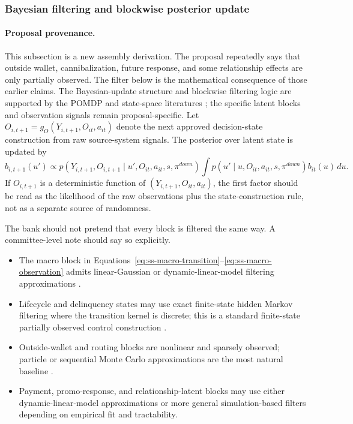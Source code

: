 \documentclass[11pt]{article}
\newcommand{\1}{\mathbf{1}}
\begin{document}
\subsubsection{Bayesian filtering and blockwise posterior update}
\label{subsec:state-space-filtering}

\paragraph{Proposal provenance.}
This subsection is a new assembly derivation. The proposal repeatedly says that
outside wallet, cannibalization, future response, and some relationship effects
are only partially observed. The filter below is the mathematical consequence of
those earlier claims. The Bayesian-update structure and blockwise filtering logic
are supported by the POMDP and state-space literatures
\citep{smallwood1973pomdp,kaelbling1998pomdp,durbinkoopman2012ssm,
westharrison1997bfdm,doucet2001smc}; the specific latent blocks and observation
signals remain proposal-specific. Let $O_{i,t+1}=g_O(Y_{i,t+1},O_{it},a_{it})$
denote the next approved decision-state construction from raw source-system
signals. The posterior over latent state is updated by
\begin{equation}
  b_{i,t+1}(u')
  \propto
  p(Y_{i,t+1},O_{i,t+1}\mid u',O_{it},a_{it},s,\pi^{down})
  \int p(u'\mid u,O_{it},a_{it},s,\pi^{down})b_{it}(u)\,du.
  \label{eq:ss-filter-update}
\end{equation}
If $O_{i,t+1}$ is a deterministic function of $(Y_{i,t+1},O_{it},a_{it})$, the
first factor should be read as the likelihood of the raw observations plus the
state-construction rule, not as a separate source of randomness.

The bank should not pretend that every block is filtered the same way. A
committee-level note should say so explicitly.
\begin{itemize}[leftmargin=*]
  \item The macro block in Equations~\eqref{eq:ss-macro-transition}--\eqref{eq:ss-macro-observation}
        admits linear-Gaussian or dynamic-linear-model filtering approximations
        \citep{durbinkoopman2012ssm,westharrison1997bfdm}.
  \item Lifecycle and delinquency states may use exact finite-state hidden
        Markov filtering where the transition kernel is discrete; this is a
        standard finite-state partially observed control construction
        \citep{smallwood1973pomdp,kaelbling1998pomdp}.
  \item Outside-wallet and routing blocks are nonlinear and sparsely observed;
        particle or sequential Monte Carlo approximations are the most natural
        baseline \citep{doucet2001smc}.
  \item Payment, promo-response, and relationship-latent blocks may use either
        dynamic-linear-model approximations or more general simulation-based
        filters depending on empirical fit and tractability.
\end{itemize}
\end{document}
